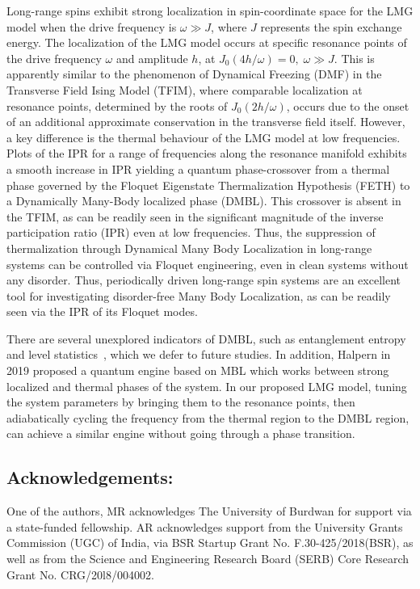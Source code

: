 \documentclass[%
reprint,
superscriptaddress,
linenumbers,
amsmath,amssymb,
aps,
prb,
showkeys,
]{revtex4-2}
\begin{document}
	 Long-range spins exhibit strong localization in spin-coordinate space for the LMG model when the drive frequency is $\omega \gg J$, where $J$ represents the spin exchange energy. The localization of the LMG model occurs at specific resonance points of the drive frequency $\omega$ and amplitude $h$, at $J_0(4h/\omega)=0,\; \omega \gg J$. This is apparently similar to the phenomenon of Dynamical Freezing (DMF) in the Transverse Field Ising Model (TFIM), where comparable localization at resonance points, determined by the roots of $J_0(2h/\omega)$, occurs due to the onset of an additional approximate conservation in the transverse field itself. However, a key difference is the thermal behaviour of the LMG model at low frequencies. Plots of the IPR for a range of frequencies along the resonance manifold exhibits a smooth increase in IPR yielding a quantum phase-crossover from a thermal phase governed by the Floquet Eigenstate Thermalization Hypothesis (FETH) to a Dynamically Many-Body localized phase (DMBL). This crossover is absent in the TFIM, as   can be readily seen in the significant magnitude of the inverse participation ratio (IPR) even at low frequencies. Thus, the suppression  of thermalization through  Dynamical Many Body Localization in long-range systems can be controlled via Floquet engineering, even in clean systems without any disorder.	Thus, periodically driven long-range spin systems are an excellent tool for investigating disorder-free Many Body Localization, as can be readily seen via the IPR of its Floquet modes. 
	
	There are several unexplored indicators of DMBL, such as entanglement entropy and level statistics~\cite{khemani_phase_2016}, which we defer to future studies. In addition, Halpern in 2019 proposed a quantum engine based on MBL\cite{yunger_halpern_quantum_2019} which works  between strong localized and thermal phases of the system. In our proposed LMG model, tuning the system parameters by bringing them to the resonance points, then adiabatically cycling the frequency from the thermal region to the DMBL region, can achieve a similar engine without going through a phase transition. 
	
	\subsection {Acknowledgements:}
	One of the authors, MR acknowledges The University of Burdwan for support via a state-funded fellowship. AR acknowledges support from the University Grants Commission (UGC) of India, via BSR Startup Grant No. F.30-425/2018(BSR), as well as from the Science and Engineering Research Board (SERB) Core Research Grant No. CRG/20l8/004002.
	
	\nocite{*}
	
	
\end{document}
